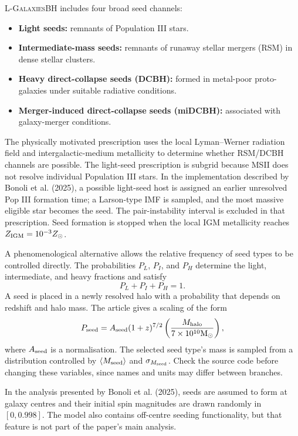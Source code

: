 \documentclass[11pt,a4paper]{article}
\newcommand{\Msun}{\mathrm{M}_{\odot}}
\newcommand{\Lgalbh}{\textsc{L-GalaxiesBH}}
\begin{document}
\Lgalbh{} includes four broad seed channels:
\begin{itemize}
  \item \textbf{Light seeds:} remnants of Population III stars.
  \item \textbf{Intermediate-mass seeds:} remnants of runaway stellar mergers (RSM) in dense stellar clusters.
  \item \textbf{Heavy direct-collapse seeds (DCBH):} formed in metal-poor proto-galaxies under suitable radiative conditions.
  \item \textbf{Merger-induced direct-collapse seeds (miDCBH):} associated with galaxy-merger conditions.
\end{itemize}

The physically motivated prescription uses the local Lyman--Werner radiation field and intergalactic-medium metallicity to determine whether RSM/DCBH channels are possible. The light-seed prescription is subgrid because MSII does not resolve individual Population III stars. In the implementation described by Bonoli et al. (2025), a possible light-seed host is assigned an earlier unresolved Pop III formation time; a Larson-type IMF is sampled, and the most massive eligible star becomes the seed. The pair-instability interval is excluded in that prescription. Seed formation is stopped when the local IGM metallicity reaches $Z_{\rm IGM}=10^{-3}Z_{\odot}$.

A phenomenological alternative allows the relative frequency of seed types to be controlled directly. The probabilities $P_L$, $P_I$, and $P_H$ determine the light, intermediate, and heavy fractions and satisfy
\begin{equation}
 P_L+P_I+P_H=1.
\end{equation}
A seed is placed in a newly resolved halo with a probability that depends on redshift and halo mass. The article gives a scaling of the form
\begin{equation}
 P_{\rm seed}=A_{\rm seed}(1+z)^{7/2}
 \left(\frac{M_{\rm halo}}{7\times10^{10}\Msun}\right),
\end{equation}
where $A_{\rm seed}$ is a normalisation. The selected seed type's mass is sampled from a distribution controlled by $\langle M_{\rm seed}\rangle$ and $\sigma_{M_{\rm seed}}$. Check the source code before changing these variables, since names and units may differ between branches.

In the analysis presented by Bonoli et al. (2025), seeds are assumed to form at galaxy centres and their initial spin magnitudes are drawn randomly in $[0,0.998]$. The model also contains off-centre seeding functionality, but that feature is not part of the paper's main analysis.
\end{document}

